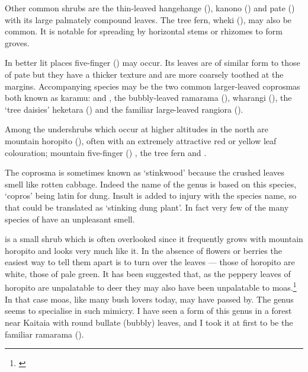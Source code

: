 Other common shrubs are the thin-leaved hangehange (), kanono () and pate () with its large palmately compound leaves.
The tree fern, wheki (), may also be common.
It is notable for spreading by horizontal stems or rhizomes to form groves.

In better lit places five-finger () may occur.
Its leaves are of similar form to those of pate but they have a thicker texture and are more coarsely toothed at the margins.
Accompanying species may be the two common larger-leaved coprosmas both known as karamu:  and , the bubbly-leaved ramarama (), wharangi (), the `tree daisies' heketara () and the familiar large-leaved rangiora ().

Among the undershrubs which occur at higher altitudes in the north are mountain horopito (), often with an extremely attractive red or yellow leaf colouration; mountain five-finger () , the tree fern  and .

The coprosma is sometimes known as `stinkwood' because the crushed leaves smell like rotten cabbage.
Indeed the name of the genus is based on this species, `copros' being latin for dung.
Insult is added to injury with the species name, so that  could be translated as `stinking dung plant'.
In fact very few of the many species of  have an unpleasant smell.

 is a small shrub which is often overlooked since it frequently grows with mountain horopito and looks very much like it.
In the absence of flowers or berries the easiest way to tell them apart is to turn over the leaves --- those of horopito are white, those of  pale green.
It has been suggested that, as the peppery leaves of horopito are unpalatable to deer they may also have been unpalatable to moas.\footnote{\cite{greenwood1977evolution}}
In that case moas, like many bush lovers today, may have passed  by.
The genus  seems to specialise in such mimicry.
I have seen a form of this genus in a forest near Kaitaia with round bullate (bubbly) leaves, and I took it at first to be the familiar ramarama ().

